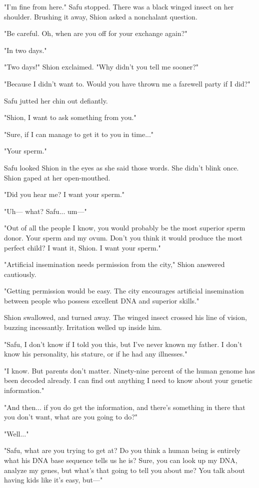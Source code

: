 "I'm fine from here." Safu stopped. There was a black winged insect on
her shoulder. Brushing it away, Shion asked a nonchalant question.

"Be careful. Oh, when are you off for your exchange again?"

"In two days."

"Two days!" Shion exclaimed. "Why didn't you tell me sooner?"

"Because I didn't want to. Would you have thrown me a farewell party if
I did?"

Safu jutted her chin out defiantly.

"Shion, I want to ask something from you."

"Sure, if I can manage to get it to you in time..."

"Your sperm."

Safu looked Shion in the eyes as she said those words. She didn't blink
once. Shion gaped at her open-mouthed.

"Did you hear me? I want your sperm."

"Uh--- what? Safu... um---"

"Out of all the people I know, you would probably be the most superior
sperm donor. Your sperm and my ovum. Don't you think it would produce
the most perfect child? I want it, Shion. I want your sperm."

"Artificial insemination needs permission from the city," Shion answered
cautiously.

"Getting permission would be easy. The city encourages artificial
insemination between people who possess excellent DNA and superior
skills."

Shion swallowed, and turned away. The winged insect crossed his line of
vision, buzzing incessantly. Irritation welled up inside him.

"Safu, I don't know if I told you this, but I've never known my father.
I don't know his personality, his stature, or if he had any illnesses."

"I know. But parents don't matter. Ninety-nine percent of the human
genome has been decoded already. I can find out anything I need to know
about your genetic information."

"And then... if you do get the information, and there's something in
there that you don't want, what are you going to do?"

"Well..."

"Safu, what are you trying to get at? Do you think a human being is
entirely what his DNA base sequence tells us he is? Sure, you can look
up my DNA, analyze my genes, but what's that going to tell you about me?
You talk about having kids like it's easy, but---"

